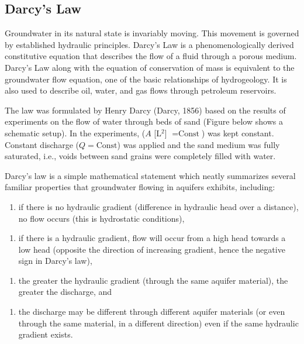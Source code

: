\documentclass[letterpaper,10pt,english]{sphinxmanual}
\let\sphinxpxdimen\pdfpxdimen\else\newdimen\sphinxpxdimen
\begin{document}
\subsection{Darcy’s Law}
\label{\detokenize{contents/flow/lecture_04/14_darcy_law_K:darcy-s-law}}
Groundwater in its natural state is invariably moving. This movement is governed by
established hydraulic principles. Darcy’s Law is a phenomenologically derived
constitutive equation that describes the flow of a fluid through a porous medium.
Darcy’s Law along with the equation of conservation of mass is equivalent to the
groundwater flow equation, one of the basic relationships of hydrogeology. It is also
used to describe oil, water, and gas flows through petroleum reservoirs.

The law was formulated by Henry Darcy (Darcy, 1856) based on the results of experiments on the flow
of water through beds of sand (Figure below shows a schematic setup). In the experiments,   (\(A\) {[}L\(^2\){]} \(= \text{Const}\)) was kept constant. Constant discharge (\(Q= \text{Const}\)) was applied and the sand medium was fully saturated, i.e., voids between sand grains were completely filled with water.

\noindent\sphinxincludegraphics[width=400\sphinxpxdimen]{{L4_f3}.png}

Darcy’s law is a simple mathematical statement which neatly summarizes several
familiar properties that groundwater flowing in aquifers exhibits, including:
\begin{enumerate}
%
\item {} 
if there
is no hydraulic gradient (difference in hydraulic head over a distance), no flow occurs
(this is hydrostatic conditions),

\end{enumerate}
\begin{enumerate}
%
\item {} 
if there is a hydraulic gradient, flow will occur from
a high head towards a low head (opposite the direction of increasing gradient, hence the
negative sign in Darcy’s law),

\end{enumerate}
\begin{enumerate}
%
\item {} 
the greater the hydraulic gradient (through the same
aquifer material), the greater the discharge, and

\end{enumerate}
\begin{enumerate}
%
\item {} 
the discharge may be different
through different aquifer materials (or even through the same material, in a different
direction) even if the same hydraulic gradient exists.

\end{enumerate}
\end{document}
